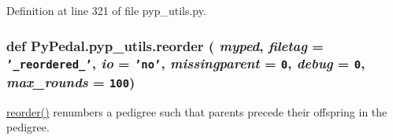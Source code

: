 Definition at line 321 of file pyp\_\-utils.py.\hypertarget{namespacePyPedal_1_1pyp__utils_4f2970c4e64c0d473968daf16237536d}{
\subsubsection[reorder]{\setlength{\rightskip}{0pt plus 5cm}def Py\-Pedal.pyp\_\-utils.reorder ( {\em myped},  {\em filetag} = {\tt '\_\-reordered\_\-'},  {\em io} = {\tt 'no'},  {\em missingparent} = {\tt 0},  {\em debug} = {\tt 0},  {\em max\_\-rounds} = {\tt 100})}}
\label{namespacePyPedal_1_1pyp__utils_4f2970c4e64c0d473968daf16237536d}


\hyperlink{namespacePyPedal_1_1pyp__utils_4f2970c4e64c0d473968daf16237536d}{reorder()} renumbers a pedigree such that parents precede their offspring in the pedigree. 

